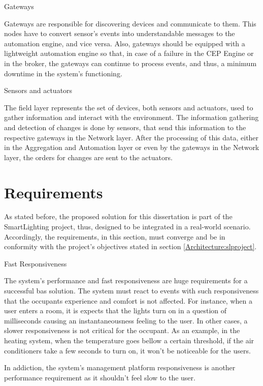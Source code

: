 \begin{Paragraph}{Gateways}
	
	Gateways are responsible for discovering devices and communicate to them. This nodes have to convert sensor's events into understandable messages to the automation engine, and vice versa. Also, gateways should be equipped with a lightweight automation engine so that, in case of a failure in the CEP Engine or in the broker, the gateways can continue to process events, and thus, a minimum downtime in the system's functioning.
	
\end{Paragraph}

\begin{Paragraph}{Sensors and actuators}
	
	The field layer represents the set of devices, both sensors and actuators, used to gather information and interact with the environment. The information gathering and detection of changes is done by sensors, that send this information to the respective gateways in the Network layer. After the processing of this data, either in the Aggregation and Automation layer or even by the gateways in the Network layer, the orders for changes are sent to the actuators.
	
\end{Paragraph}

\section{Requirements}
\label{Architecture:Requirements}
As stated before, the proposed solution for this dissertation is part of the SmartLighting project, thus, designed to be integrated in a real-world scenario. Accordingly, the requirements, in this section, must converge and be in conformity with the project's objectives stated in section \ref{Architecture:slproject}. 

\begin{Paragraph}{Fast Responsiveness}

The system's performance and fast responsiveness are huge requirements for a successful \ac{bas} solution. The system must react to events with such responsiveness that the occupants experience and comfort is not affected. For instance, when a user enters a room, it is expects that the lights turn on in a question of milliseconds causing an instantaneousness feeling to the user. In other cases, a slower responsiveness is not critical for the occupant. As an example, in the heating system, when the temperature goes bellow a certain threshold, if the air conditioners take a few seconds to turn on, it won't be noticeable for the users.

In addiction, the system's management platform responsiveness is another performance requirement as it shouldn't feel slow to the user.

\end{Paragraph}

